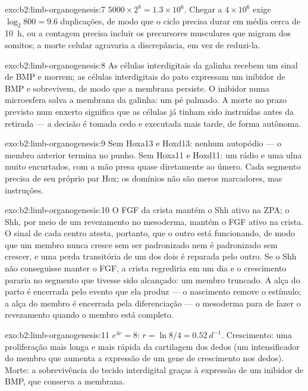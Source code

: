 \begin{solution}{exo:b2:limb-organogenesis:7}
$5000\times 2^{8} = 1.3\times 10^{6}$. Chegar a $4\times 10^{6}$ exige
$\log_2 800 = 9.6$ duplicações, de modo que o ciclo precisa durar em
média cerca de \qty{10}{h}, ou a contagem precisa incluir os
precursores musculares que migram dos somitos; a morte celular
agravaria a discrepância, em vez de reduzi-la.
\end{solution}

\begin{solution}{exo:b2:limb-organogenesis:8}
As células interdigitais da galinha recebem um sinal de BMP e morrem;
as células interdigitais do pato expressam um inibidor de BMP e
sobrevivem, de modo que a membrana persiste. O inibidor numa
microesfera salva a membrana da galinha: um pé palmado. A morte no
prazo previsto num enxerto significa que as células já tinham sido
instruídas antes da retirada --- a decisão é tomada cedo e executada
mais tarde, de forma autônoma.
\end{solution}

\begin{solution}{exo:b2:limb-organogenesis:9}
Sem Hoxa13 e Hoxd13: nenhum autopódio --- o membro anterior termina no
punho. Sem Hoxa11 e Hoxd11: um rádio e uma ulna muito encurtados, com a
mão presa quase diretamente ao úmero. Cada segmento precisa de seu
próprio par Hox; os domínios não são meros marcadores, mas instruções.
\end{solution}

\begin{solution}{exo:b2:limb-organogenesis:10}
O FGF da crista mantém o Shh ativo na ZPA; o Shh, por meio de um
revezamento no mesoderma, mantém o FGF ativo na crista. O sinal de
cada centro atesta, portanto, que o outro está funcionando, de modo que
um membro nunca cresce sem ser padronizado nem é padronizado sem
crescer, e uma perda transitória de um dos dois é reparada pelo outro.
Se o Shh não conseguisse manter o FGF, a crista regrediria em um dia e
o crescimento pararia no segmento que tivesse sido alcançado: um membro
truncado. A alça do parto é encerrada pelo evento que ela produz --- o
nascimento remove o estímulo; a alça do membro é encerrada pela
diferenciação --- o mesoderma para de fazer o revezamento quando o
membro está completo.
\end{solution}

\begin{solution}{exo:b2:limb-organogenesis:11}
$e^{4r} = 8$: $r = \ln 8/4 = \qty{0.52}{d^{-1}}$. Crescimento: uma
proliferação mais longa e mais rápida da cartilagem dos dedos (um
intensificador do membro que aumenta a expressão de um gene de
crescimento nos dedos). Morte: a sobrevivência do tecido interdigital
graças à expressão de um inibidor de BMP, que conserva a membrana.
\end{solution}

